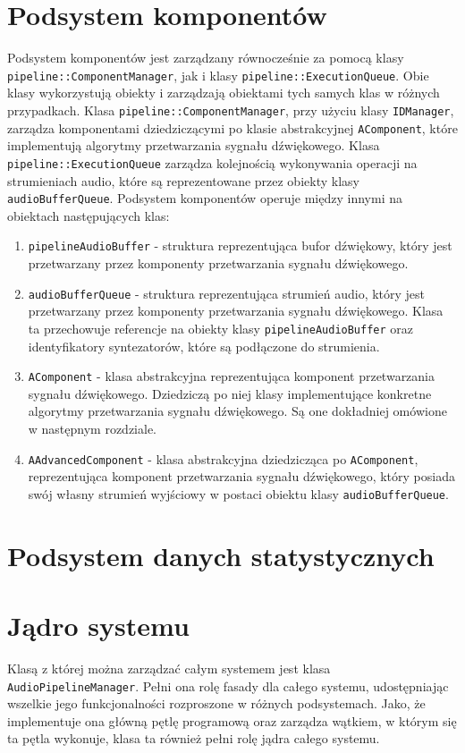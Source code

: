 \section{Podsystem komponentów}
Podsystem komponentów jest zarządzany równocześnie za pomocą klasy \texttt{pipeline::ComponentManager}, jak i klasy \texttt{pipeline::ExecutionQueue}. Obie klasy wykorzystują obiekty i zarządzają obiektami tych samych klas w różnych przypadkach. Klasa \texttt{pipeline::ComponentManager}, przy użyciu klasy \texttt{IDManager}, zarządza komponentami dziedziczącymi po klasie abstrakcyjnej \texttt{AComponent}, które implementują algorytmy przetwarzania sygnału dźwiękowego. Klasa \texttt{pipeline::ExecutionQueue} zarządza kolejnością wykonywania operacji na strumieniach audio, które są reprezentowane przez obiekty klasy \texttt{audioBufferQueue}. Podsystem komponentów operuje między innymi na obiektach następujących klas:
\begin{enumerate}
    \item \texttt{pipelineAudioBuffer} - struktura reprezentująca bufor dźwiękowy, który jest przetwarzany przez komponenty przetwarzania sygnału dźwiękowego.
    \item \texttt{audioBufferQueue} - struktura reprezentująca strumień audio, który jest przetwarzany przez komponenty przetwarzania sygnału dźwiękowego. Klasa ta przechowuje referencje na obiekty klasy \texttt{pipelineAudioBuffer} oraz identyfikatory syntezatorów, które są podłączone do strumienia.
    \item \texttt{AComponent} - klasa abstrakcyjna reprezentująca komponent przetwarzania sygnału dźwiękowego. Dziedziczą po niej klasy implementujące konkretne algorytmy przetwarzania sygnału dźwiękowego. Są one dokładniej omówione w następnym rozdziale.
    \item \texttt{AAdvancedComponent} - klasa abstrakcyjna dziedzicząca po \texttt{AComponent}, reprezentująca komponent przetwarzania sygnału dźwiękowego, który posiada swój własny strumień wyjściowy w postaci obiektu klasy \texttt{audioBufferQueue}. 
\end{enumerate}

\section{Podsystem danych statystycznych}

\section{Jądro systemu}
Klasą z której można zarządzać całym systemem jest klasa \texttt{AudioPipelineManager}. Pełni ona rolę fasady dla całego systemu, udostępniając wszelkie jego funkcjonalności rozproszone w różnych podsystemach. Jako, że implementuje ona główną pętlę programową oraz zarządza wątkiem, w którym się ta pętla wykonuje, klasa ta również pełni rolę jądra całego systemu. 

